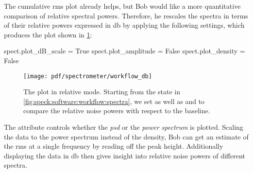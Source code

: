 The cumulative \gls{rms} plot already helps, but Bob would like a more quantitative comparison of relative spectral powers.
Therefore, he rescales the spectra in terms of their relative powers expressed in \unit{\decibel}
by applying the following settings, which produces the plot shown in \cref{fig:speck:software:workflow:db}:
\begin{py}
    spect.plot_dB_scale = True
    spect.plot_amplitude = False
    spect.plot_density = False
\end{py}
\begin{figure}
    \centering
    \texttt{[image: pdf/spectrometer/workflow\_db]}
    \caption[The \pyspeck plot in relative mode.]{
        The \pyspeck plot in relative mode.
        Starting from the state in \cref{fig:speck:software:workflow:spectra}, we set  as well as  and  to compare the relative noise powers with respect to the baseline.
    }
    \label{fig:speck:software:workflow:db}
\end{figure}
The attribute  controls whether the \emph{\acrlong{psd}} or the \emph{power spectrum} is plotted.
Scaling the data to the power spectrum instead of the density, Bob can get an estimate of the \gls{rms} at a single frequency by reading off the peak height.
Additionally displaying the data in \unit{\decibel} then gives insight into relative noise powers of different spectra.

